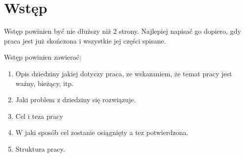 %


\chapter*{Wstęp}

Wstęp powinien być nie dłuższy niż 2 strony. Najlepiej napisać go dopiero, gdy praca jest już skończona i wszystkie jej części spisane.

Wstęp powinien zawierać:

\begin{enumerate}
\item Opis dziedziny jakiej dotyczy praca, ze wskazaniem, że temat pracy jest ważny, bieżący, itp.
\item Jaki problem z dziedziny się rozwiązuje.
\item Cel i teza pracy
\item W jaki sposób cel zostanie osiągnięty a tez potwierdzona.
\item Struktura pracy.
\end{enumerate} 